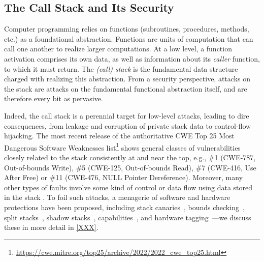 \subsection{The Call Stack and Its Security}

Computer programming relies on functions (subroutines, procedures, methods, etc.)
as a foundational abstraction. Functions are units of computation that
can call one another to realize larger computations.
%
At a low level, a function activation comprises its own data, as
well as information about its \emph{caller} function, to which it must return.
The \emph{(call) stack} is the fundamental data structure charged with realizing
this abstraction. From a security perspective, attacks on the stack are attacks
on the fundamental functional abstraction itself, and are therefore every bit as
pervasive.

Indeed, the call stack is a perennial target for low-level attacks, leading to
dire consequences, from leakage and corruption of private stack data
to control-flow hijacking.
%
The most recent release of the authoritative CWE Top 25
Most Dangerous Software Weaknesses
list\footnote{\url{https://cwe.mitre.org/top25/archive/2022/2022_cwe_top25.html}}
shows general classes of vulnerabilities closely related to the stack 
consistently at and near the top, e.g., \#1 (CWE-787, Out-of-bounds Write), \#5 (CWE-125, Out-of-bounds Read), \#7 (CWE-416, Use After Free) or \#11 (CWE-476, NULL Pointer Dereference).
%
Moreover, many other types of faults involve some kind of control or data flow
using data stored in the stack .
%
To foil such attacks, a menagerie of
software and hardware protections have been proposed,
%
including stack canaries~\cite{Cowan+98},
bounds checking~\cite{NagarakatteZMZ09,NagarakatteZMZ10,DeviettiBMZ08},
split stacks~\cite{Kuznetsov+14},
shadow stacks~\cite{Dang+15,Shanbhogue+19},
capabilities~\cite{Woodruff+14,Chisnall+15,SkorstengaardLocal,SkorstengaardSTKJFP,Georges+21},
and hardware tagging~\cite{DBLP:conf/sp/RoesslerD18}---we discuss these in more
detail in \cref{XXX}.
  \ifaftersubmission{}
\fi
%
%

